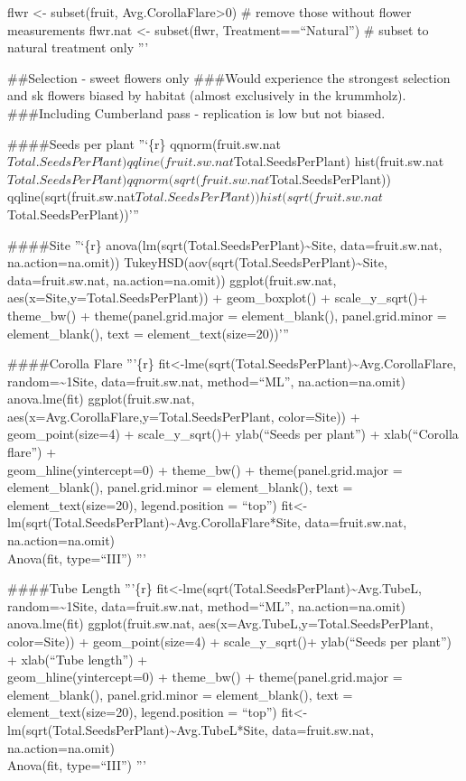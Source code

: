 \documentclass[]{article}
\begin{document}
flwr \textless{}- subset(fruit, Avg.CorollaFlare\textgreater{}0) \#
remove those without flower measurements flwr.nat \textless{}-
subset(flwr, Treatment==``Natural'') \# subset to natural treatment only
'''

\#\#Selection - sweet flowers only \#\#\#Would experience the strongest
selection and sk flowers biased by habitat (almost exclusively in the
krummholz). \#\#\#Including Cumberland pass - replication is low but not
biased.

\#\#\#\#Seeds per plant ''`\{r\}
qqnorm(fruit.sw.nat\(Total.SeedsPerPlant) qqline(fruit.sw.nat\)Total.SeedsPerPlant)
hist(fruit.sw.nat\(Total.SeedsPerPlant) qqnorm(sqrt(fruit.sw.nat\)Total.SeedsPerPlant))
qqline(sqrt(fruit.sw.nat\(Total.SeedsPerPlant)) hist(sqrt(fruit.sw.nat\)Total.SeedsPerPlant))'''

\#\#\#\#Site ''`\{r\}
anova(lm(sqrt(Total.SeedsPerPlant)\textasciitilde{}Site,
data=fruit.sw.nat, na.action=na.omit))
TukeyHSD(aov(sqrt(Total.SeedsPerPlant)\textasciitilde{}Site,
data=fruit.sw.nat, na.action=na.omit)) ggplot(fruit.sw.nat,
aes(x=Site,y=Total.SeedsPerPlant)) + geom\_boxplot() + scale\_y\_sqrt()+
theme\_bw() + theme(panel.grid.major = element\_blank(),
panel.grid.minor = element\_blank(), text = element\_text(size=20))'''

\#\#\#\#Corolla Flare '''\{r\}
fit\textless{}-lme(sqrt(Total.SeedsPerPlant)\textasciitilde{}Avg.CorollaFlare,
random=\textasciitilde{}1\textbar{}Site, data=fruit.sw.nat,
method=``ML'', na.action=na.omit)\\
anova.lme(fit) ggplot(fruit.sw.nat,
aes(x=Avg.CorollaFlare,y=Total.SeedsPerPlant, color=Site)) +
geom\_point(size=4) + scale\_y\_sqrt()+ ylab(``Seeds per plant'') +
xlab(``Corolla flare'') +\\
geom\_hline(yintercept=0) + theme\_bw() + theme(panel.grid.major =
element\_blank(), panel.grid.minor = element\_blank(), text =
element\_text(size=20), legend.position = ``top'')
fit\textless{}-lm(sqrt(Total.SeedsPerPlant)\textasciitilde{}Avg.CorollaFlare*Site,
data=fruit.sw.nat, na.action=na.omit)\\
Anova(fit, type=``III'') '''

\#\#\#\#Tube Length '''\{r\}
fit\textless{}-lme(sqrt(Total.SeedsPerPlant)\textasciitilde{}Avg.TubeL,
random=\textasciitilde{}1\textbar{}Site, data=fruit.sw.nat,
method=``ML'', na.action=na.omit)\\
anova.lme(fit) ggplot(fruit.sw.nat,
aes(x=Avg.TubeL,y=Total.SeedsPerPlant, color=Site)) +
geom\_point(size=4) + scale\_y\_sqrt()+ ylab(``Seeds per plant'') +
xlab(``Tube length'') +\\
geom\_hline(yintercept=0) + theme\_bw() + theme(panel.grid.major =
element\_blank(), panel.grid.minor = element\_blank(), text =
element\_text(size=20), legend.position = ``top'')
fit\textless{}-lm(sqrt(Total.SeedsPerPlant)\textasciitilde{}Avg.TubeL*Site,
data=fruit.sw.nat, na.action=na.omit)\\
Anova(fit, type=``III'') '''
\end{document}

